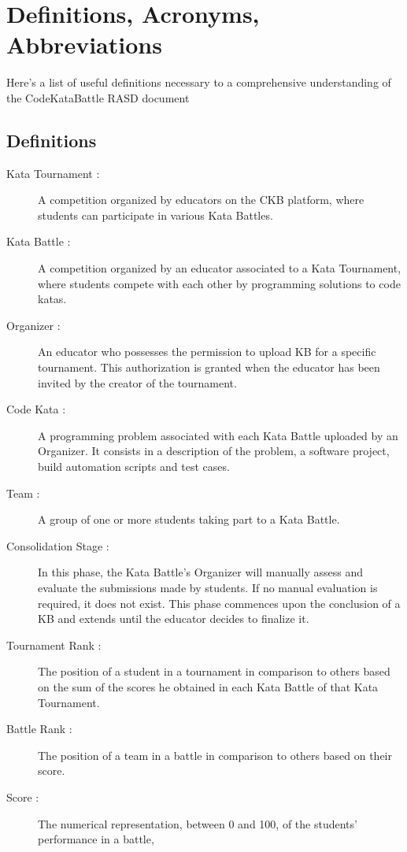 \documentclass[11pt]{report}
\begin{document}
    \newpage
    \section{Definitions, Acronyms, Abbreviations}
    Here's a list of useful definitions necessary to a comprehensive understanding of the CodeKataBattle RASD document
    \subsection{Definitions} \label{definitions}
    \begin{description}
        \item[Kata Tournament :] A competition organized by educators on the CKB platform, where students
            can participate in various Kata Battles.
        \item[Kata Battle :] A competition organized by an educator associated to a Kata Tournament, where students
            compete with each other by programming solutions to code katas.
        \item[Organizer :] An educator who possesses the permission to upload KB for a specific tournament.
        This authorization is granted when the educator has been invited by the creator of the tournament.
        \item[Code Kata :] A programming problem associated with each Kata Battle uploaded by an Organizer.
            It consists in a description of the problem, a software project, build automation scripts and test cases.
        \item[Team :] A group of one or more students taking part to a Kata Battle.
        \item[Consolidation Stage :] In this phase, the Kata Battle's Organizer will manually assess and evaluate the submissions made by students.
            If no manual evaluation is required, it does not exist.
            This phase commences upon the conclusion of a KB and extends until the educator decides to finalize it.
        \item[Tournament Rank :] The position of a student in a tournament in comparison to others based on the sum of the scores
        he obtained in each Kata Battle of that Kata Tournament.
        \item[Battle Rank :] The position of a team in a battle in comparison to others based on their score.
        \item[Score :] The numerical representation, between 0 and 100, of the students' performance in a battle,

\end{description}
\end{document}

